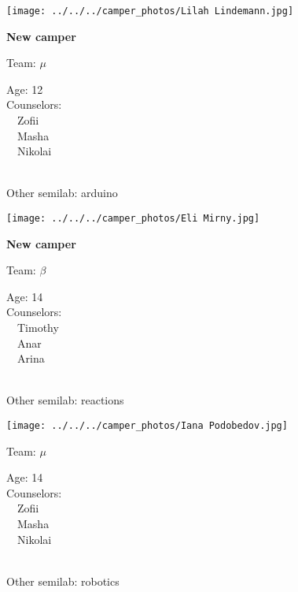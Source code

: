 \documentclass[10pt,letterpaper, landscape]{article}
\begin{document}
\horizontalshiftfornextsticker
\renewcommand{\baselinestretch}{1} \begin{sticker}
\noindent\begin{minipage}{0.5\textwidth}\texttt{[image: ../../../camper\_photos/Lilah Lindemann.jpg]}\end{minipage}\begin{minipage}{0.45\textwidth}
\textbf{New camper} 

Team: {\Large $\mu$}

Age:        12\\
Counselors: \\\ \ Zofii\\\ \ Masha\\\ \ Nikolai\\
\end{minipage} \\ \vspace{0.07in}
Other semilab: arduino
\end{sticker}
\horizontalshiftfornextsticker
\renewcommand{\baselinestretch}{1} \begin{sticker}
\noindent\begin{minipage}{0.5\textwidth}\texttt{[image: ../../../camper\_photos/Eli Mirny.jpg]}\end{minipage}\begin{minipage}{0.45\textwidth}
\textbf{New camper} 

Team: {\Large $\beta$}

Age:        14\\
Counselors: \\\ \ Timothy\\\ \ Anar\\\ \ Arina\\
\end{minipage} \\ \vspace{0.07in}
Other semilab: reactions
\end{sticker}
\verticalshiftfornextsticker
\renewcommand{\baselinestretch}{1} \begin{sticker}
\noindent\begin{minipage}{0.5\textwidth}\texttt{[image: ../../../camper\_photos/Iana Podobedov.jpg]}\end{minipage}\begin{minipage}{0.45\textwidth}
Team: {\Large $\mu$}

Age:        14\\
Counselors: \\\ \ Zofii\\\ \ Masha\\\ \ Nikolai\\
\end{minipage} \\ \vspace{0.07in}
Other semilab: robotics
\end{sticker}
\end{document}
